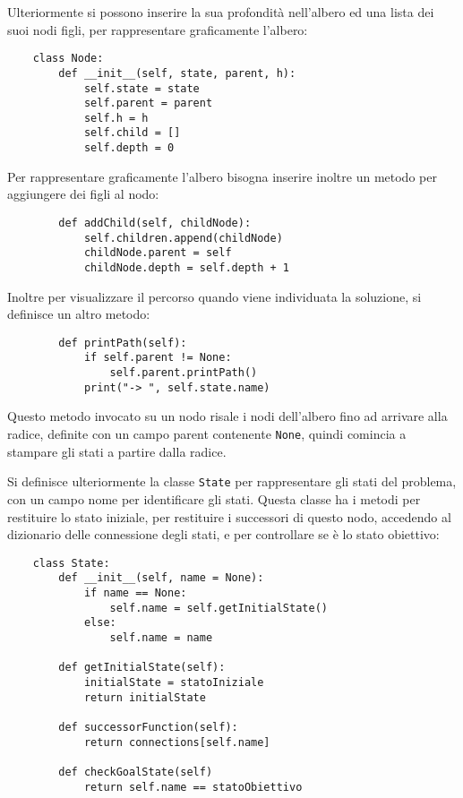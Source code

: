 \documentclass{article}
\numberwithin{equation}{subsection}
\begin{document}
Ulteriormente si possono inserire la sua profondità nell'albero ed una lista dei suoi nodi figli, 
per rappresentare graficamente l'albero:
\begin{verbatim}
    class Node:
        def __init__(self, state, parent, h):
            self.state = state
            self.parent = parent
            self.h = h
            self.child = []
            self.depth = 0
\end{verbatim}

Per rappresentare graficamente l'albero bisogna inserire inoltre un metodo per aggiungere 
dei figli al nodo:
\begin{verbatim}
        def addChild(self, childNode):
            self.children.append(childNode)
            childNode.parent = self
            childNode.depth = self.depth + 1
\end{verbatim}

Inoltre per visualizzare il percorso quando viene individuata la soluzione, si definisce 
un altro metodo:
\begin{verbatim}
        def printPath(self):
            if self.parent != None:
                self.parent.printPath()
            print("-> ", self.state.name)
\end{verbatim}

Questo metodo invocato su un nodo risale i nodi dell'albero fino ad arrivare alla radice, 
definite con un campo parent contenente \verb|None|, quindi comincia a stampare gli 
stati a partire dalla radice. 

Si definisce ulteriormente la classe \verb|State| per rappresentare gli stati del problema, con 
un campo nome per identificare gli stati. Questa classe ha i metodi per restituire lo 
stato iniziale, per restituire i successori di questo nodo, accedendo al dizionario delle 
connessione degli stati, e per controllare se è lo stato obiettivo:
\begin{verbatim}
    class State:
        def __init__(self, name = None):
            if name == None:
                self.name = self.getInitialState()
            else:
                self.name = name

        def getInitialState(self):
            initialState = statoIniziale
            return initialState

        def successorFunction(self):
            return connections[self.name]

        def checkGoalState(self)
            return self.name == statoObiettivo
\end{verbatim}
\end{document}
